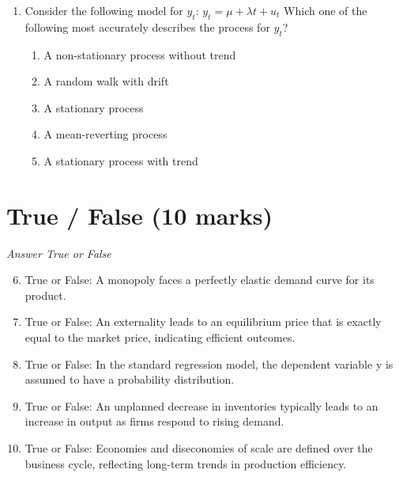 \documentclass[12pt]{article}
\begin{document}
\begin{enumerate}[label=\arabic*.]
\begin{enumerate}[label=(\alph*)]
    \item affect domestic prices: the former lowers them while the latter raises them.
    \item reduce the overall cost of goods for consumers.
    \item have no impact on the volume of trade between nations.
    \item result in higher domestic prices.
    \item ensure the stability of international markets without influencing domestic markets.
\end{enumerate}
\item Consider the following model for $y_t$: $y_t = \mu + \lambda t + u_t$ Which one of the following most accurately describes the process for $y_t$?
\begin{enumerate}[label=(\alph*)]
    \item A non-stationary process without trend
    \item A random walk with drift
    \item A stationary process
    \item A mean-reverting process
    \item A stationary process with trend
\end{enumerate}
\end{enumerate}

\section*{True / False (10 marks)}
\textit{Answer True or False}
\begin{enumerate}[label=\arabic*.]
\setcounter{enumi}{5}
\item True or False: A monopoly faces a perfectly elastic demand curve for its product.
\item True or False: An externality leads to an equilibrium price that is exactly equal to the market price, indicating efficient outcomes.
\item True or False: In the standard regression model, the dependent variable y is assumed to have a probability distribution.
\item True or False: An unplanned decrease in inventories typically leads to an increase in output as firms respond to rising demand.
\item True or False: Economies and diseconomies of scale are defined over the business cycle, reflecting long-term trends in production efficiency.
\end{enumerate}
\end{document}
